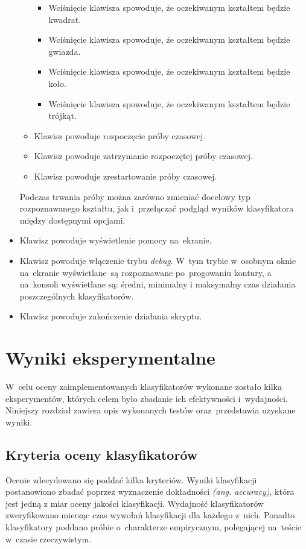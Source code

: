 \documentclass[11pt,a4paper]{article}
\begin{document}
\begin{itemize}
\begin{itemize}
\begin{itemize}
            \item Wciśnięcie klawisza  spowoduje, że oczekiwanym kształtem będzie kwadrat.
            \item Wciśnięcie klawisza  spowoduje, że oczekiwanym kształtem będzie gwiazda.
            \item Wciśnięcie klawisza  spowoduje, że oczekiwanym kształtem będzie koło.
            \item Wciśnięcie klawisza  spowoduje, że oczekiwanym kształtem będzie trójkąt.
        \end{itemize}
        \item Klawisz  powoduje rozpoczęcie próby czasowej.
        \item Klawisz  powoduje zatrzymanie rozpoczętej próby czasowej.
        \item Klawisz  powoduje zrestartowanie próby czasowej.
    \end{itemize}
    Podczas trwania próby można zarówno zmieniać docelowy typ rozpoznawanego kształtu, jak i~przełączać podgląd wyników klasyfikatora między dostępnymi opcjami.
    \item Klawisz  powoduje wyświetlenie pomocy na~ekranie.
    \item Klawisz  powoduje włączenie trybu \emph{debug}.
    W~tym trybie w~osobnym oknie na~ekranie wyświetlane~są rozpoznawane po~progowaniu kontury, a na~konsoli wyświetlane są: średni, minimalny i maksymalny czas działania poszczególnych klasyfikatorów.
    \item Klawisz  powoduje zakończenie działania skryptu.
\end{itemize}

\section{Wyniki eksperymentalne}

W~celu oceny zaimplementowanych klasyfikatorów wykonane zostało kilka eksperymentów, których celem było zbadanie ich efektywności i~wydajności.
Niniejszy rozdział zawiera opis wykonanych testów oraz~przedstawia uzyskane wyniki.

\subsection{Kryteria oceny klasyfikatorów}

Ocenie zdecydowano się poddać kilka kryteriów. Wyniki klasyfikacji postanowiono zbadać poprzez wyznaczenie dokładności \emph{(ang. accuracy)}, która jest jedną z miar oceny jakości klasyfikacji. Wydajność klasyfikatorów zweryfikowano mierząc czas wywołań klasyfikacji dla każdego z~nich. Ponadto klasyfikatory poddano próbie o~charakterze empirycznym, polegającej na~teście w~czasie rzeczywistym. 
\end{document}
